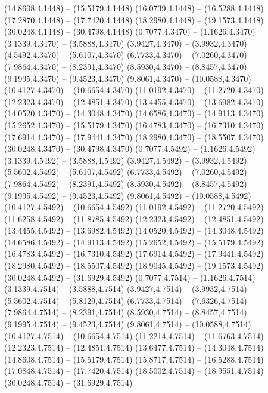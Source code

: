 {\begin{scope}[shift={(#1,#2)}]
    (14.8608,4.1448) -- (15.5179,4.1448)
    (16.0739,4.1448) -- (16.5288,4.1448)
    (17.2870,4.1448) -- (17.7420,4.1448)
    (18.2980,4.1448) -- (19.1573,4.1448)
    (30.0248,4.1448) -- (30.4798,4.1448)
    (0.7077,4.3470) -- (1.1626,4.3470)
    (3.1339,4.3470) -- (3.5888,4.3470)
    (3.9427,4.3470) -- (3.9932,4.3470)
    (4.5492,4.3470) -- (5.6107,4.3470)
    (6.7733,4.3470) -- (7.0260,4.3470)
    (7.9864,4.3470) -- (8.2391,4.3470)
    (8.5930,4.3470) -- (8.8457,4.3470)
    (9.1995,4.3470) -- (9.4523,4.3470)
    (9.8061,4.3470) -- (10.0588,4.3470)
    (10.4127,4.3470) -- (10.6654,4.3470)
    (11.0192,4.3470) -- (11.2720,4.3470)
    (12.2323,4.3470) -- (12.4851,4.3470)
    (13.4455,4.3470) -- (13.6982,4.3470)
    (14.0520,4.3470) -- (14.3048,4.3470)
    (14.6586,4.3470) -- (14.9113,4.3470)
    (15.2652,4.3470) -- (15.5179,4.3470)
    (16.4783,4.3470) -- (16.7310,4.3470)
    (17.6914,4.3470) -- (17.9441,4.3470)
    (18.2980,4.3470) -- (18.5507,4.3470)
    (30.0248,4.3470) -- (30.4798,4.3470)
    (0.7077,4.5492) -- (1.1626,4.5492)
    (3.1339,4.5492) -- (3.5888,4.5492)
    (3.9427,4.5492) -- (3.9932,4.5492)
    (5.5602,4.5492) -- (5.6107,4.5492)
    (6.7733,4.5492) -- (7.0260,4.5492)
    (7.9864,4.5492) -- (8.2391,4.5492)
    (8.5930,4.5492) -- (8.8457,4.5492)
    (9.1995,4.5492) -- (9.4523,4.5492)
    (9.8061,4.5492) -- (10.0588,4.5492)
    (10.4127,4.5492) -- (10.6654,4.5492)
    (11.0192,4.5492) -- (11.2720,4.5492)
    (11.6258,4.5492) -- (11.8785,4.5492)
    (12.2323,4.5492) -- (12.4851,4.5492)
    (13.4455,4.5492) -- (13.6982,4.5492)
    (14.0520,4.5492) -- (14.3048,4.5492)
    (14.6586,4.5492) -- (14.9113,4.5492)
    (15.2652,4.5492) -- (15.5179,4.5492)
    (16.4783,4.5492) -- (16.7310,4.5492)
    (17.6914,4.5492) -- (17.9441,4.5492)
    (18.2980,4.5492) -- (18.5507,4.5492)
    (18.9045,4.5492) -- (19.1573,4.5492)
    (30.0248,4.5492) -- (31.6929,4.5492)
    (0.7077,4.7514) -- (1.1626,4.7514)
    (3.1339,4.7514) -- (3.5888,4.7514)
    (3.9427,4.7514) -- (3.9932,4.7514)
    (5.5602,4.7514) -- (5.8129,4.7514)
    (6.7733,4.7514) -- (7.6326,4.7514)
    (7.9864,4.7514) -- (8.2391,4.7514)
    (8.5930,4.7514) -- (8.8457,4.7514)
    (9.1995,4.7514) -- (9.4523,4.7514)
    (9.8061,4.7514) -- (10.0588,4.7514)
    (10.4127,4.7514) -- (10.6654,4.7514)
    (11.2214,4.7514) -- (11.6763,4.7514)
    (12.2323,4.7514) -- (12.4851,4.7514)
    (13.6477,4.7514) -- (14.3048,4.7514)
    (14.8608,4.7514) -- (15.5179,4.7514)
    (15.8717,4.7514) -- (16.5288,4.7514)
    (17.0848,4.7514) -- (17.7420,4.7514)
    (18.5002,4.7514) -- (18.9551,4.7514)
    (30.0248,4.7514) -- (31.6929,4.7514)

\end{scope}}
